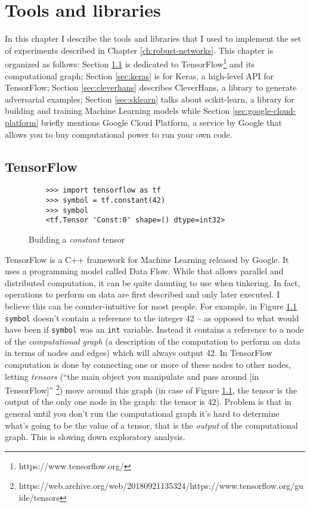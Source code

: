 \chapter{Tools and libraries}

In this chapter I describe the tools and libraries that I used to
implement the set of experiments described in Chapter
\ref{ch:robust-networks}. This chapter is organized as follows: Section
\ref{sec:tensorflow} is dedicated to
TensorFlow\footnote{https://www.tensorflow.org/} and its computational
graph; Section \ref{sec:keras} is for Keras, a high-level API for
TensorFlow; Section \ref{sec:cleverhans} describes CleverHans, a
library to generate adversarial examples; Section \ref{sec:sklearn}
talks about scikit-learn, a library for building and training Machine
Learning models while Section \ref{sec:google-cloud-platform} briefly
mentions Google Cloud Platform, a service by Google that allows you to
buy computational power to run your own code.

\section{TensorFlow}
\label{sec:tensorflow}

\begin{figure}
  \begin{verbatim}
    >>> import tensorflow as tf
    >>> symbol = tf.constant(42)
    >>> symbol
    <tf.Tensor 'Const:0' shape=() dtype=int32>
  \end{verbatim}
  \caption{Building a \emph{constant} tensor}
  \label{fig:fortytwo}
\end{figure}

TensorFlow is a C++ framework for Machine Learning released by Google.
It uses a programming model called Data Flow. While that allows
parallel and distributed computation, it can be quite daunting to use
when tinkering. In fact, operations to perform on data are first
described and only later executed. I believe this can be
counter-intuitive for most people. For example, in Figure
\ref{fig:fortytwo} \texttt{symbol} doesn't contain a reference to the
integer 42 -- as opposed to what would have been if \texttt{symbol} was
an \texttt{int} variable. Instead it contains a reference to a node of
the \emph{computational graph} (a description of the computation to
perform on data in terms of nodes and edges) which will always output
42. In TensorFlow computation is done by connecting one or more of
these nodes to other nodes, letting \emph{tensors} (``the main object
you manipulate and pass around [in TensorFlow]''%
\footnote{https://web.archive.org/web/20180921135324/https://www.tensorflow.org/guide/tensors})
move around this graph (in case of Figure \ref{fig:fortytwo}, the
tensor is the output of the only one node in the graph: the tensor is
42). Problem is that in general until you don't run the computational
graph it's hard to determine what's going to be the value of a tensor,
that is the \emph{output} of the computational graph. This is slowing
down exploratory analysis.

